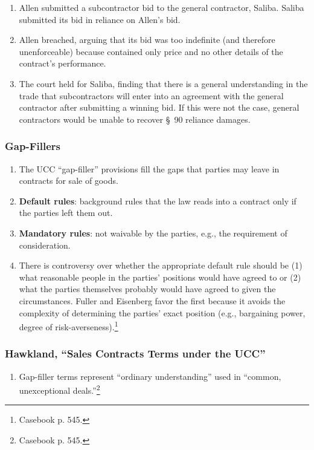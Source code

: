 \begin{enumerate}
    \item Allen submitted a subcontractor bid to the general contractor, 
    Saliba. Saliba submitted its bid in reliance on Allen's bid.
    \item Allen breached, arguing that its bid was too indefinite (and 
    therefore unenforceable) because contained only price and no other details 
    of the contract's performance.
    \item The court held for Saliba, finding that there is a general 
    understanding in the trade that subcontractors will enter into an 
    agreement with the general contractor after submitting a winning bid. If 
    this were not the case, general contractors would be unable to recover \S\ 
    90 reliance damages.
\end{enumerate}

\subsubsection{Gap-Fillers}

\begin{enumerate}
    \item The UCC ``gap-filler'' provisions fill the gaps that parties may 
    leave in contracts for sale of goods.
    \item \textbf{Default rules}: background rules that the law reads into a 
    contract only if the parties left them out.
    \item \textbf{Mandatory rules}: not waivable by the parties, e.g., the 
    requirement of consideration.
    \item There is controversy over whether the appropriate default rule 
    should be (1) what reasonable people in the parties' positions would have 
    agreed to or (2) what the parties themselves probably would have agreed to 
    given the circumstances. Fuller and Eisenberg favor the first because it 
    avoids the complexity of determining the parties' exact position (e.g., 
    bargaining power, degree of risk-averseness).\footnote{Casebook p. 545.}
\end{enumerate}

\subsubsection{Hawkland, ``Sales Contracts Terms under the UCC''}

\begin{enumerate}
    \item Gap-filler terms represent ``ordinary understanding'' used in 
    ``common, unexceptional deals.''\footnote{Casebook p. 545.}
\end{enumerate}

